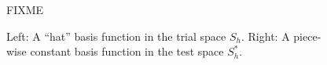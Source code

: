\documentclass[11pt]{amsart}
\begin{document}
\begin{figure}[ht]
\begin{center}
FIXME
\end{center}
\caption{Left: A ``hat'' basis function in the trial space $S_h$.  Right: A piece-wise constant basis function in the test space $S_h^*$.}
\label{fig:fembases}
\end{figure}





\begin{comment}
Here is what the MPAS Land-Ice User's Manual version 3.0 says:

\begin{quote}
\small
Velocities and fluxes are calculated on the midpoint of Voronoi cell edges.  The normal component of surface slope is calculated on cell edges using surface elevation at adjacent cell centers.  The tangential component of surface slope is calculated on cell edges using surface elevation at adjacent vertices. The surface elevation at vertices is calculated from the values at adjacent cell centers using barycentric interpolation. Ice thickness on edges is calculated as the average of the adjacent cell center values (2nd-order approximation).
\end{quote}

Looking at this, and the code, I don't think they think of it as Petrov-Galerkin
\end{comment}
\end{document}
